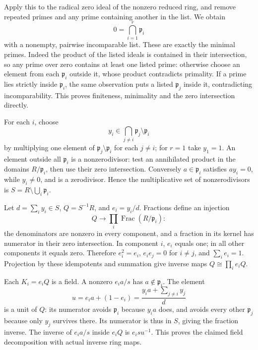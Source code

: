 \documentclass[11pt,a4paper,openany]{report}
\newcounter{none}
\begin{document}
Apply this to the radical zero ideal of the nonzero reduced ring, and remove repeated primes and any prime containing another in the list. We obtain \[
0=\bigcap_{i=1}^r\mathfrak p_i
\] with a nonempty, pairwise incomparable list. These are exactly the minimal primes. Indeed the product of the listed ideals is contained in their intersection, so any prime over zero contains at least one listed prime: otherwise choose an element from each \(\mathfrak p_i\) outside it, whose product contradicts primality. If a prime lies strictly inside \(\mathfrak p_i\), the same observation puts a listed \(\mathfrak p_j\) inside it, contradicting incomparability. This proves finiteness, minimality and the zero intersection directly.

For each \(i\), choose \[
y_i\in\bigcap_{j\ne i}\mathfrak p_j\setminus\mathfrak p_i
\] by multiplying one element of \(\mathfrak p_j\setminus\mathfrak p_i\) for each \(j\ne i\); for \(r=1\) take \(y_1=1\). An element outside all \(\mathfrak p_i\) is a nonzerodivisor: test an annihilated product in the domains \(R/\mathfrak p_i\), then use their zero intersection. Conversely \(a\in\mathfrak p_i\) satisfies \(ay_i=0\), while \(y_i\ne0\), and is a zerodivisor. Hence the multiplicative set of nonzerodivisors is \(S=R\setminus\bigcup_i\mathfrak p_i\).

Let \(d=\sum_i y_i\in S\), \(Q=S^{-1}R\), and \(e_i=y_i/d\). Fractions define an injection \[
Q\longrightarrow\prod_i\operatorname{Frac}(R/\mathfrak p_i):
\] the denominators are nonzero in every component, and a fraction in its kernel has numerator in their zero intersection. In component \(i\), \(e_i\) equals one; in all other components it equals zero. Therefore \(e_i^2=e_i\), \(e_ie_j=0\) for \(i\ne j\), and \(\sum_i e_i=1\). Projection by these idempotents and summation give inverse maps \(Q\cong\prod_i e_iQ\).

Each \(K_i=e_iQ\) is a field. A nonzero \(e_i a/s\) has \(a\notin\mathfrak p_i\). The element \[
u=e_i a+(1-e_i)
 =\frac{y_i a+\sum_{j\ne i}y_j}{d}
\] is a unit of \(Q\): its numerator avoids \(\mathfrak p_i\) because \(y_i a\) does, and avoids every other \(\mathfrak p_j\) because only \(y_j\) survives there. Its numerator is thus in \(S\), giving the fraction inverse. The inverse of \(e_i a/s\) inside \(e_iQ\) is \(e_i s u^{-1}\). This proves the claimed field decomposition with actual inverse ring maps.
\end{document}
